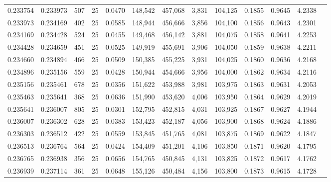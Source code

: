 \begin{tabular}{rrrrrrrrrrrrr}
0.233754 & 0.233973 &   507 &  25 &                                     0.0470 & 148,542 & 457,068 &   3,831 & 104,125 & 0.1855 & 0.9645 & 4.2338 \\
0.233973 & 0.234169 &   402 &  25 &                                     0.0585 & 148,944 & 456,666 &   3,856 & 104,100 & 0.1856 & 0.9643 & 4.2301 \\
0.234169 & 0.234428 &   524 &  25 &                                     0.0455 & 149,468 & 456,142 &   3,881 & 104,075 & 0.1858 & 0.9641 & 4.2253 \\
0.234428 & 0.234659 &   451 &  25 &                                     0.0525 & 149,919 & 455,691 &   3,906 & 104,050 & 0.1859 & 0.9638 & 4.2211 \\
0.234660 & 0.234894 &   466 &  25 &                                     0.0509 & 150,385 & 455,225 &   3,931 & 104,025 & 0.1860 & 0.9636 & 4.2168 \\
0.234896 & 0.235156 &   559 &  25 &                                     0.0428 & 150,944 & 454,666 &   3,956 & 104,000 & 0.1862 & 0.9634 & 4.2116 \\
0.235156 & 0.235461 &   678 &  25 &                                     0.0356 & 151,622 & 453,988 &   3,981 & 103,975 & 0.1863 & 0.9631 & 4.2053 \\
0.235463 & 0.235641 &   368 &  25 &                                     0.0636 & 151,990 & 453,620 &   4,006 & 103,950 & 0.1864 & 0.9629 & 4.2019 \\
0.235641 & 0.236007 &   805 &  25 &                                     0.0301 & 152,795 & 452,815 &   4,031 & 103,925 & 0.1867 & 0.9627 & 4.1944 \\
0.236007 & 0.236302 &   628 &  25 &                                     0.0383 & 153,423 & 452,187 &   4,056 & 103,900 & 0.1868 & 0.9624 & 4.1886 \\
0.236303 & 0.236512 &   422 &  25 &                                     0.0559 & 153,845 & 451,765 &   4,081 & 103,875 & 0.1869 & 0.9622 & 4.1847 \\
0.236513 & 0.236764 &   564 &  25 &                                     0.0424 & 154,409 & 451,201 &   4,106 & 103,850 & 0.1871 & 0.9620 & 4.1795 \\
0.236765 & 0.236938 &   356 &  25 &                                     0.0656 & 154,765 & 450,845 &   4,131 & 103,825 & 0.1872 & 0.9617 & 4.1762 \\
0.236939 & 0.237114 &   361 &  25 &                                     0.0648 & 155,126 & 450,484 &   4,156 & 103,800 & 0.1873 & 0.9615 & 4.1728 \\

\end{tabular}
